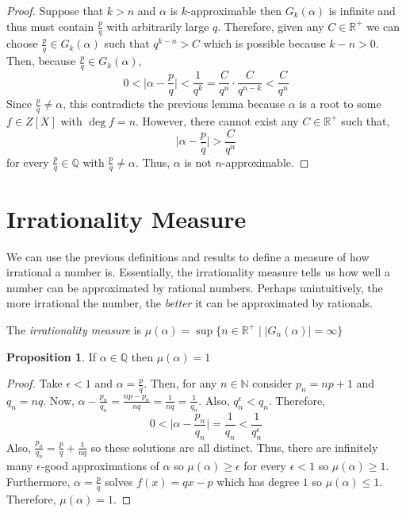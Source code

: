 \documentclass{article}
\newcommand{\N}{\mathbb{N}}
\newcommand{\Q}{\mathbb{Q}}
\newcommand{\Rplus}{\mathbb{R}^+}
\newenvironment{definition}[1][Definition:]{\begin{trivlist}
\item[\hskip \labelsep {\bfseries #1}]}{\end{trivlist}}
\theoremstyle{theorem}
\theoremstyle{definition}
\theoremstyle{definition}
\newtheorem*{proposition}{Proposition}
\theoremstyle{remark}
\theoremstyle{definition}
\theoremstyle{remark}
\begin{document}
\begin{proof}
Suppose that $k > n$ and $\alpha$ is $k$-approximable then $G_k(\alpha)$ is infinite and thus must contain $\frac{p}{q}$ with arbitrarily large $q$. Therefore, given any $C \in \Rplus$ we can choose $\frac{p}{q} \in G_k(\alpha)$ such that $q^{k-n} > C$ which is possible because $k - n > 0$. Then, because $\frac{p}{q} \in G_k(\alpha)$,
\[ 0 < \Big| \alpha - \frac{p}{q} \Big| < \frac{1}{q^k} = \frac{C}{q^n} \cdot \frac{C}{q^{n-k}} < \frac{C}{q^n}\]
Since $\frac{p}{q} \neq \alpha$, this contradicts the previous lemma because $\alpha$ is a root to some $f \in Z[X]$ with $\deg{f} = n$. However, there cannot exist any $C \in \Rplus$ such that, 
\[ \Big| \alpha - \frac{p}{q} \Big| > \frac{C}{q^n}\]
for every $\frac{p}{q} \in \Q$ with $\frac{p}{q} \neq \alpha$. Thus, $\alpha$ is not $n$-approximable. 
\end{proof}

\section{Irrationality Measure} 

We can use the previous definitions and results to define a measure of how irrational a number is. Essentially, the irrationality measure tells us how well a number can be approximated by rational numbers. Perhaps unintuitively, the more irrational the number, the \textit{better} it can be approximated by rationals.

\begin{definition}
The \textit{irrationality measure} is $\mu(\alpha) = \sup\{n \in \Rplus \mid |G_n(\alpha)| = \infty\}$   
\end{definition}


\begin{proposition}
If $\alpha \in \Q$ then $\mu(\alpha) = 1$
\end{proposition}

\begin{proof}
Take $\epsilon < 1$ and $\alpha = \frac{p}{q}$. Then, for any $n \in \N$ consider $p_n = np + 1$ and $q_n = nq$. Now, $\alpha - \frac{p_n}{q_n} = \frac{np - p_n}{nq} = \frac{1}{nq} = \frac{1}{q_n}$. Also, $q_n^\epsilon < q_n$. Therefore,
\[  0 < \Big| \alpha - \frac{p_n}{q_n} \Big| = \frac{1}{q_n} < \frac{1}{q_n^\epsilon}\]
Also, $\frac{p_n}{q_n} = \frac{p}{q} + \frac{1}{nq}$ so these solutions are all distinct. Thus, there are infinitely many $\epsilon$-good approximations of $\alpha$ so $\mu(\alpha) \ge \epsilon$ for every $\epsilon < 1$ so $\mu(\alpha) \ge 1$. Furthermore, $\alpha = \frac{p}{q}$ solves $f(x) = qx - p$ which has degree $1$ so $\mu(\alpha) \le 1$. Therefore, $\mu(\alpha) = 1$. 
\end{proof}
\end{document}
